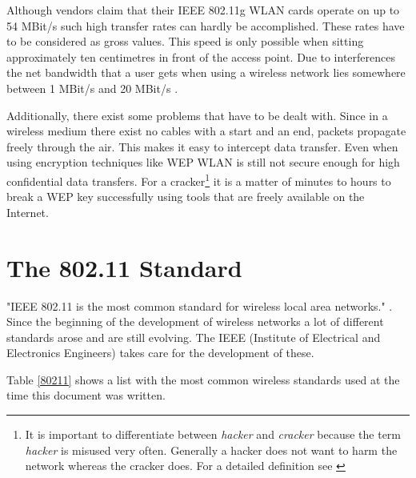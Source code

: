 Although vendors claim that their IEEE 802.11g WLAN cards operate on up to 54 MBit/s such high transfer rates can hardly be accomplished. These rates have to be considered as gross values. This speed is only possible when sitting approximately ten centimetres in front of the access point. Due to interferences the net bandwidth that a user gets when using a wireless network lies somewhere between 1 MBit/s and 20 MBit/s \cite{wlan_grundlagen}.

Additionally, there exist some problems that have to be dealt with. Since in a wireless medium there exist no cables with a start and an end, packets propagate freely through the air. This makes it easy to intercept data transfer. Even when using encryption techniques like WEP WLAN is still not secure enough for high confidential data transfers. For a cracker\footnote{It is important to differentiate between {\em hacker} and {\em cracker} because the term {\em hacker} is misused very often. Generally a hacker does not want to harm the network whereas the cracker does. For a detailed definition see \cite{vrijschrift}} it is a matter of minutes to hours to break a WEP key successfully using tools that are freely available on the Internet.

\section{The 802.11 Standard}

"IEEE 802.11 is the most common standard for wireless local area networks." \cite{80211mostcommon}. Since the beginning of the development of wireless networks a lot of different standards arose and are still evolving. The IEEE (Institute of Electrical and Electronics Engineers) takes care for the development of these. 

Table \ref{80211} shows a list with the most common wireless standards used at the time this document was written. 

